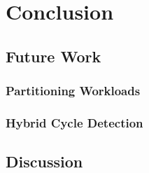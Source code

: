 \chapter{Conclusion}
\section{Future Work}
\subsection{Partitioning Workloads}
\subsection{Hybrid Cycle Detection}
\section{Discussion}
